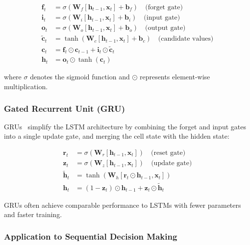 \begin{align}
\mathbf{f}_t &= \sigma(\mathbf{W}_f [\mathbf{h}_{t-1}, \mathbf{x}_t] + \mathbf{b}_f) \quad \text{(forget gate)} \\
\mathbf{i}_t &= \sigma(\mathbf{W}_i [\mathbf{h}_{t-1}, \mathbf{x}_t] + \mathbf{b}_i) \quad \text{(input gate)} \\
\mathbf{o}_t &= \sigma(\mathbf{W}_o [\mathbf{h}_{t-1}, \mathbf{x}_t] + \mathbf{b}_o) \quad \text{(output gate)} \\
\tilde{\mathbf{c}}_t &= \tanh(\mathbf{W}_c [\mathbf{h}_{t-1}, \mathbf{x}_t] + \mathbf{b}_c) \quad \text{(candidate values)} \\
\mathbf{c}_t &= \mathbf{f}_t \odot \mathbf{c}_{t-1} + \mathbf{i}_t \odot \tilde{\mathbf{c}}_t \\
\mathbf{h}_t &= \mathbf{o}_t \odot \tanh(\mathbf{c}_t)
\end{align}

where $\sigma$ denotes the sigmoid function and $\odot$ represents element-wise multiplication.

\subsubsection{Gated Recurrent Unit (GRU)}

GRUs~\cite{cho2014learning} simplify the LSTM architecture by combining the forget and input gates into a single update gate, and merging the cell state with the hidden state:

\begin{align}
\mathbf{r}_t &= \sigma(\mathbf{W}_r [\mathbf{h}_{t-1}, \mathbf{x}_t]) \quad \text{(reset gate)} \\
\mathbf{z}_t &= \sigma(\mathbf{W}_z [\mathbf{h}_{t-1}, \mathbf{x}_t]) \quad \text{(update gate)} \\
\tilde{\mathbf{h}}_t &= \tanh(\mathbf{W}_h [\mathbf{r}_t \odot \mathbf{h}_{t-1}, \mathbf{x}_t]) \\
\mathbf{h}_t &= (1 - \mathbf{z}_t) \odot \mathbf{h}_{t-1} + \mathbf{z}_t \odot \tilde{\mathbf{h}}_t
\end{align}

GRUs often achieve comparable performance to LSTMs with fewer parameters and faster training.

\subsubsection{Application to Sequential Decision Making}

